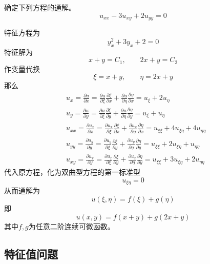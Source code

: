 \documentclass[lang = cn, scheme = chinese, thmcnt = section]{elegantbook}
\begin{document}
\begin{example}
	确定下列方程的通解。
	$$
	u_{xx}-3u_{xy}+2u_{yy}=0
	$$
\end{example}

\begin{solution}
	特征方程为
	$$
	y_x^2+3y_x+2=0
	$$
	特征解为
	$$
	x+y=C_1,\qquad 
	2x+y=C_2
	$$
	作变量代换
	$$
	\xi=x+y,\qquad 
	\eta=2x+y
	$$
	那么
	\begin{align*}
		& u_x=\frac{\partial u}{\partial x}=\frac{\partial u}{\partial \xi}\frac{\partial \xi}{\partial x}+\frac{\partial u}{\partial \eta}\frac{\partial \eta}{\partial x}=u_{\xi}+2u_{\eta}\\
		& u_y=\frac{\partial u}{\partial y}=\frac{\partial u}{\partial \xi}\frac{\partial \xi}{\partial y}+\frac{\partial u}{\partial \eta}\frac{\partial \eta}{\partial y}=u_{\xi}+u_{\eta}\\
		& u_{xx}=\frac{\partial u_x}{\partial x}=\frac{\partial u_x}{\partial \xi}\frac{\partial \xi}{\partial x}+\frac{\partial u_x}{\partial \eta}\frac{\partial \eta}{\partial x}=u_{\xi\xi}+4u_{\xi\eta}+4u_{\eta\eta}\\
		& u_{yy}=\frac{\partial u_y}{\partial y}=\frac{\partial u_y}{\partial \xi}\frac{\partial \xi}{\partial y}+\frac{\partial u_y}{\partial \eta}\frac{\partial \eta}{\partial y}=u_{\xi\xi}+2u_{\xi\eta}+u_{\eta\eta}\\
		& u_{xy}=\frac{\partial u_x}{\partial y}=\frac{\partial u_x}{\partial \xi}\frac{\partial \xi}{\partial y}+\frac{\partial u_x}{\partial \eta}\frac{\partial \eta}{\partial y}=u_{\xi\xi}+3u_{\xi\eta}+2u_{\eta\eta}
	\end{align*}
	代入原方程，化为双曲型方程的第一标准型
	$$
	u_{\xi\eta}=0
	$$
	从而通解为
	$$
	u(\xi,\eta)=f(\xi)+g(\eta)
	$$
	即
	$$
	u(x,y)=f(x+y)+g(2x+y)
	$$
	其中$f,g$​​为任意二阶连续可微函数。
\end{solution}

\subsection{特征值问题}
\end{document}
